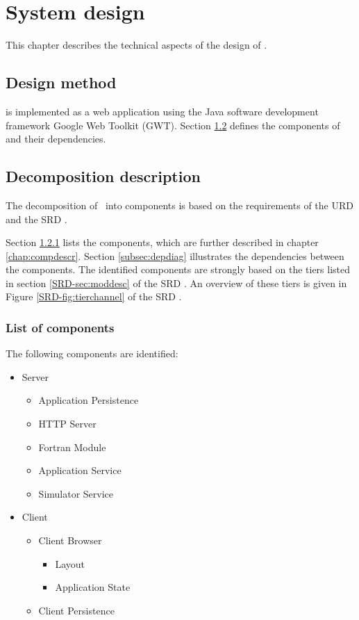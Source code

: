 \chapter{System design}
\label{chap:systdesign}
This chapter describes the technical aspects of the design of \projectname.

\section{Design method}
\projectname{} is implemented as a web application using the Java software development framework Google Web Toolkit (GWT). Section \ref{sec:decompdescr} defines the components of \projectname{} and their dependencies.


\section{Decomposition description}
\label{sec:decompdescr}
The decomposition of \projectname\ into components is based on the requirements of the URD \cite{urd} and the SRD \cite{srd}.

\fpstartparagraph{} Section \ref{subsec:complist} lists the components, which are further described in chapter \ref{chap:compdescr}. Section \ref{subsec:depdiag} illustrates the dependencies between the components. The identified components are strongly based on the tiers listed in section \ref*{SRD-sec:moddesc} of the SRD \cite{srd}. An overview of these tiers is given in Figure  \ref*{SRD-fig:tierchannel} of the SRD \cite{srd}.

\subsection{List of components}
\label{subsec:complist}
The following components are identiﬁed:

\begin{itemize}
	\item Server
	\begin{itemize}
		\item Application Persistence
		\item HTTP Server
		\item Fortran Module
		\item Application Service
		\item Simulator Service
	\end{itemize}
		\item Client
	\begin{itemize}
		\item Client Browser
	\begin{itemize}
		\item Layout
		\item Application State
	\end{itemize}
		\item Client Persistence
	\end{itemize}
\end{itemize}

